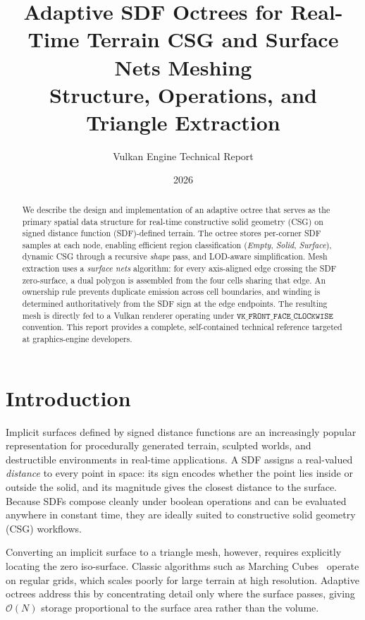 \documentclass[10pt,a4paper]{article}
\title{%
  \textbf{Adaptive SDF Octrees for Real-Time Terrain CSG and Surface Nets Meshing}\\[4pt]
  {\large Structure, Operations, and Triangle Extraction}
}
\author{Vulkan Engine Technical Report}
\date{2026}
\begin{document}
\maketitle

\begin{abstract}
We describe the design and implementation of an adaptive octree that
serves as the primary spatial data structure for real-time constructive
solid geometry (CSG) on signed distance function (SDF)-defined terrain.
The octree stores per-corner SDF samples at each node, enabling
efficient region classification (\emph{Empty}, \emph{Solid},
\emph{Surface}), dynamic CSG through a recursive \emph{shape} pass, and
LOD-aware simplification.  Mesh extraction uses a \emph{surface nets}
algorithm: for every axis-aligned edge crossing the SDF zero-surface, a
dual polygon is assembled from the four cells sharing that edge.  An
ownership rule prevents duplicate emission across cell boundaries, and
winding is determined authoritatively from the SDF sign at the edge
endpoints.  The resulting mesh is directly fed to a Vulkan renderer
operating under $\texttt{VK\_FRONT\_FACE\_CLOCKWISE}$ convention.  This
report provides a complete, self-contained technical reference targeted at
graphics-engine developers.
\end{abstract}

\tableofcontents
\newpage

\section{Introduction}
\label{sec:intro}

Implicit surfaces defined by signed distance functions are an
increasingly popular representation for procedurally generated terrain,
sculpted worlds, and destructible environments in real-time applications.
A SDF assigns a real-valued \emph{distance} to every point in space: its
sign encodes whether the point lies inside or outside the solid, and its
magnitude gives the closest distance to the surface.  Because SDFs compose
cleanly under boolean operations and can be evaluated anywhere in constant
time, they are ideally suited to constructive solid geometry (CSG)
workflows.

Converting an implicit surface to a triangle mesh, however, requires
explicitly locating the zero iso-surface.  Classic algorithms such as
Marching Cubes~\cite{lorensen87} operate on regular grids, which scales
poorly for large terrain at high resolution.  Adaptive octrees address
this by concentrating detail only where the surface passes, giving
$\mathcal{O}(N)$ storage proportional to the surface area rather than the
volume.
\end{document}
